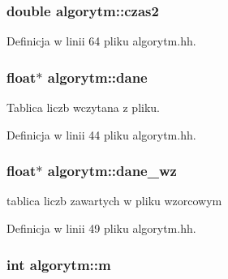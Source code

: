 \hypertarget{classalgorytm_abf8a655cd9b1acea00ba90893d38567b}{
\subsubsection[{czas2}]{\setlength{\rightskip}{0pt plus 5cm}double {\bf algorytm\-::czas2}}}\label{classalgorytm_abf8a655cd9b1acea00ba90893d38567b}


\-Definicja w linii 64 pliku algorytm.\-hh.

\hypertarget{classalgorytm_a5dd6d510b611002cfb9737f12eeff63f}{
\subsubsection[{dane}]{\setlength{\rightskip}{0pt plus 5cm}float$\ast$ {\bf algorytm\-::dane}}}\label{classalgorytm_a5dd6d510b611002cfb9737f12eeff63f}


\-Tablica liczb wczytana z pliku. 



\-Definicja w linii 44 pliku algorytm.\-hh.

\hypertarget{classalgorytm_a93fb0f7a64eb1e4f8492445395f98e5f}{
\subsubsection[{dane\-\_\-wz}]{\setlength{\rightskip}{0pt plus 5cm}float$\ast$ {\bf algorytm\-::dane\-\_\-wz}}}\label{classalgorytm_a93fb0f7a64eb1e4f8492445395f98e5f}


tablica liczb zawartych w pliku wzorcowym 



\-Definicja w linii 49 pliku algorytm.\-hh.

\hypertarget{classalgorytm_ac9429e88b0630a008df4d011458ee5a2}{
\subsubsection[{m}]{\setlength{\rightskip}{0pt plus 5cm}int {\bf algorytm\-::m}}}\label{classalgorytm_ac9429e88b0630a008df4d011458ee5a2}


